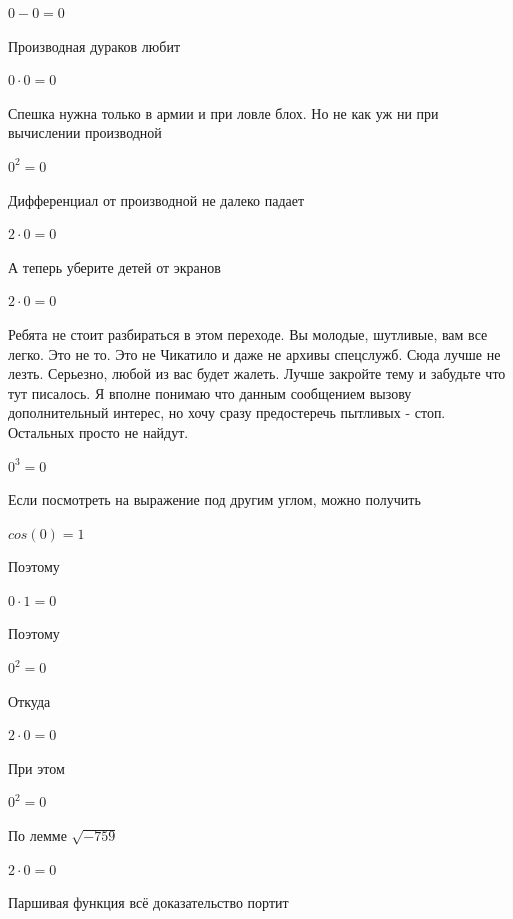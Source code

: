 \documentclass[12pt,a4paper,fleqn]{article}
\begin{document}
\begin{center}$0-0 = 0$\end{center}
Производная дураков любит\cite{link2}

\begin{center}$0 \cdot 0 = 0$\end{center}
Спешка нужна только в армии и при ловле блох. Но не как уж ни при вычислении производной\cite{link2}

\begin{center}$0^{2} = 0$\end{center}
Дифференциал от производной не далеко падает\cite{link2}

\begin{center}$2 \cdot 0 = 0$\end{center}
А теперь уберите детей от экранов

\begin{center}$2 \cdot 0 = 0$\end{center}
Ребята не стоит разбираться в этом переходе. Вы молодые, шутливые, вам все легко. Это не то. Это не Чикатило и даже не архивы спецслужб. Сюда лучше не лезть. Серьезно, любой из вас будет жалеть. Лучше закройте тему и забудьте что тут писалось. Я вполне понимаю что данным сообщением вызову дополнительный интерес, но хочу сразу предостеречь пытливых - стоп. Остальных просто не найдут.

\begin{center}$0^{3} = 0$\end{center}
Если посмотреть на выражение под другим углом, можно получить

\begin{center}$cos(0) = 1$\end{center}
Поэтому

\begin{center}$0 \cdot 1 = 0$\end{center}
Поэтому

\begin{center}$0^{2} = 0$\end{center}
Откуда

\begin{center}$2 \cdot 0 = 0$\end{center}
При этом

\begin{center}$0^{2} = 0$\end{center}
По лемме $\sqrt{-759}$
\begin{center}$2 \cdot 0 = 0$\end{center}
Паршивая функция всё доказательство портит\cite{link2}
\end{document}
